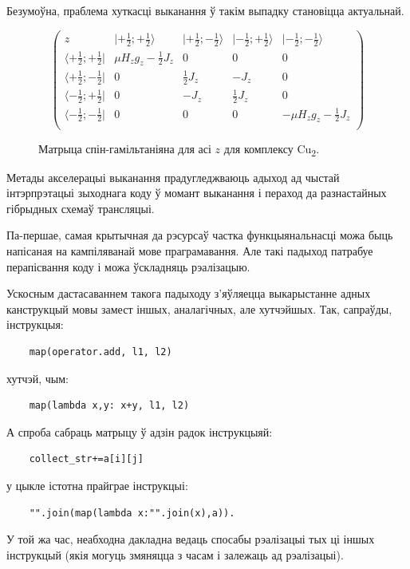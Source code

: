 \documentclass[a4paper,12pt]{article}
\begin{document}
Безумоўна, праблема хуткасці выканання ў такім выпадку становіцца актуальнай.

\begin{figure}[ht]
$$
\left(
\begin{array}{c|cccc}
z &|+\frac{1}{2};+\frac{1}{2}\rangle&|+\frac{1}{2};-\frac{1}{2}\rangle&|-\frac{1}{2};+\frac{1}{2}\rangle&|-\frac{1}{2};-\frac{1}{2}\rangle\\
\hline
\langle+\frac{1}{2};+\frac{1}{2}|& \mu H_z g_z-\frac{1}{2}J_z & 0 & 0 & 0\\
\langle+\frac{1}{2};-\frac{1}{2}|& 0 & \frac{1}{2}J_z  & -J_z & 0\\
\langle-\frac{1}{2};+\frac{1}{2}|& 0 & -J_z & \frac{1}{2}J_z & 0\\
\langle-\frac{1}{2};-\frac{1}{2}|& 0 & 0 & 0 & -\mu H_zg_z-\frac{1}{2}J_z\\
\end{array}
\right)
$$
\caption{Матрыца спін-гамільтаніяна для асі $z$ для комплексу Cu\textsubscript{2}.}
\label{fig:spin_ham}
\end{figure}

Метады акселерацыі выканання прадугледжваюць адыход ад чыстай інтэрпрэтацыі зыходнага коду ў момант выканання і пераход да разнастайных гібрыдных схемаў трансляцыі.

Па-першае, самая крытычная да рэсурсаў частка функцыянальнасці можа быць напісаная на кампіляванай мове праграмавання. Але такі падыход патрабуе перапісвання коду і можа ўскладняць рэалізацыю.

Ускосным дастасаваннем такога падыходу з'яўляецца выкарыстанне адных канструкцый мовы замест іншых, аналагічных, але хутчэйшых\cite{Optimize}.  Так, сапраўды, інструкцыя:
\begin{verbatim}
    map(operator.add, l1, l2) 
\end{verbatim}
хутчэй, чым:
\begin{verbatim}
    map(lambda x,y: x+y, l1, l2)
\end{verbatim}
 А спроба сабраць матрыцу ў адзін радок інструкцыяй:
\begin{verbatim}
    collect_str+=a[i][j]  
\end{verbatim}
 у цыкле істотна прайграе інструкцыі:
\begin{verbatim} 
    "".join(map(lambda x:"".join(x),a)).
\end{verbatim}
У той жа час, неабходна дакладна ведаць спосабы рэалізацыі тых ці іншых інструкцый (якія могуць змяняцца з часам і залежаць ад рэалізацыі).
\end{document}

